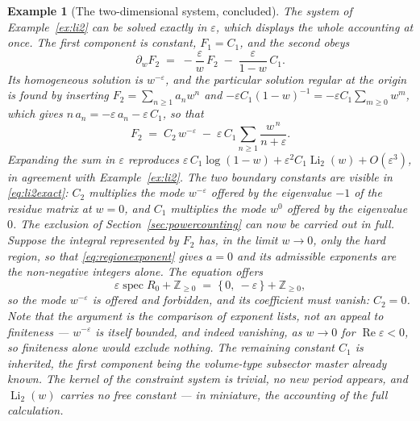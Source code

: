 \documentclass[11pt]{article}
\newcommand{\eps}{\varepsilon}
\newcommand{\Z}{\mathbb{Z}}
\newtheorem{example}[definition]{Example}
\begin{document}
\begin{example}[The two-dimensional system, concluded]
\label{ex:li2concluded}
The system of Example~\ref{ex:li2} can be solved exactly in $\eps$,
which displays the whole accounting at once.  The first component is
constant, $F_1 = C_1$, and the second obeys
\begin{equation}
  \partial_w F_2 \;=\; -\frac{\eps}{w}\,F_2
  \;-\; \frac{\eps}{1-w}\,C_1 .
\end{equation}
Its homogeneous solution is $w^{-\eps}$, and the particular solution
regular at the origin is found by inserting $F_2 = \sum_{n\ge1}
a_n w^n$ and $-\eps C_1(1-w)^{-1} = -\eps C_1\sum_{m\ge0}w^m$, which
gives $n\,a_n = -\eps\,a_n - \eps\,C_1$, so that
\begin{equation}
  F_2 \;=\; C_2\,w^{-\eps}
  \;-\; \eps\,C_1 \sum_{n\ge1}\frac{w^{\,n}}{n+\eps} .
  \label{eq:li2exact}
\end{equation}
Expanding the sum in $\eps$ reproduces
$\eps\,C_1\log(1-w) + \eps^2 C_1\operatorname{Li}_2(w) + O(\eps^3)$,
in agreement with Example~\ref{ex:li2}.  The two boundary constants
are visible in \eqref{eq:li2exact}: $C_2$ multiplies the mode
$w^{-\eps}$ offered by the eigenvalue $-1$ of the residue matrix at
$w = 0$, and $C_1$ multiplies the mode $w^0$ offered by the
eigenvalue $0$.  The exclusion of Section~\ref{sec:powercounting}
can now be carried out in full.  Suppose the integral represented by
$F_2$ has, in the limit $w \to 0$, only the hard region, so that
\eqref{eq:regionexponent} gives $a = 0$ and its admissible exponents
are the non-negative integers alone.  The equation offers
\begin{equation}
  \eps\operatorname{spec}R_0 + \Z_{\ge0}
  \;=\; \{\,0,\ -\eps\,\} + \Z_{\ge 0} ,
\end{equation}
so the mode $w^{-\eps}$ is offered and forbidden, and its coefficient
must vanish: $C_2 = 0$.  Note that the argument is the comparison of
exponent lists, not an appeal to finiteness --- $w^{-\eps}$ is itself
bounded, and indeed vanishing, as $w \to 0$ for
$\operatorname{Re}\eps < 0$, so finiteness alone would exclude
nothing.  The remaining constant $C_1$ is inherited, the first
component being the volume-type subsector master already known.  The
kernel of the constraint system is trivial, no new period appears,
and $\operatorname{Li}_2(w)$ carries no free constant --- in
miniature, the accounting of the full calculation.
\end{example}

\end{document}
